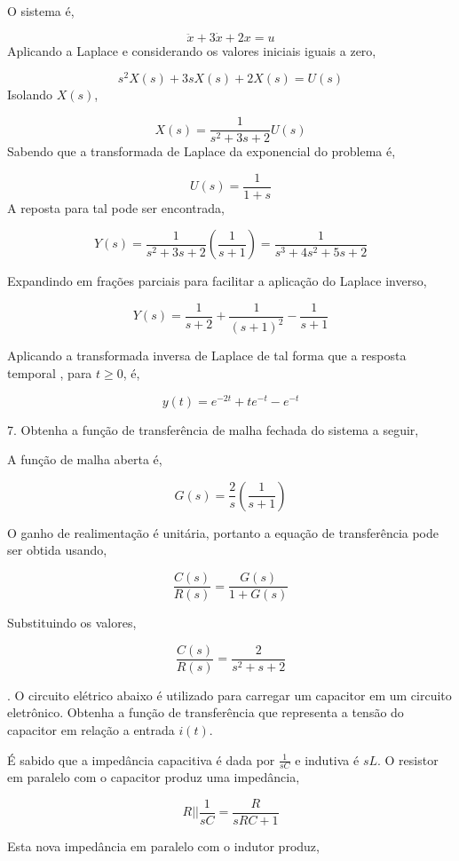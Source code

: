 \documentclass[paper=a4, fontsize=11pt]{article}
\begin{document}
O sistema é,

$$
\ddot{x} + 3 \dot{x} + 2 x = u
$$
Aplicando a Laplace e considerando os valores iniciais iguais a zero,

$$
s^2 X(s) + 3 s X(s) + 2 X(s) = U(s)
$$
Isolando $X(s)$,

$$
X(s) = \frac{1}{s^2 + 3s + 2} U(s)
$$
Sabendo que a transformada de Laplace da exponencial do problema é,

$$
U(s)=\frac{1}{1+s}
$$
A reposta para tal pode ser encontrada,

$$
Y(s) = \frac{1}{s^2 + 3s + 2} \left(\frac{1}{s+1}\right) = \frac{1}{s^3 + 4 s^2 + 5 s +2}
$$

Expandindo em frações parciais para facilitar a aplicação do Laplace inverso,

$$
Y(s) = \frac{1}{s+2} + \frac{1}{(s+1)^2} - \frac{1}{s+1}
$$

Aplicando a transformada inversa de Laplace de tal forma que a resposta temporal , para $t\geq0$, é,

$$
y(t) = e^{-2t} + t e^{-t} - e^{-t}
$$

\newpage

7. Obtenha a função de transferência de malha fechada do sistema a seguir,

A função de malha aberta é,

$$
G(s) = \frac{2}{s} \left(\frac{1}{s+1}\right)
$$

O ganho de realimentação é unitária, portanto a equação de transferência pode ser 
obtida usando,

$$
\frac{C(s)}{R(s)} = \frac{G(s)}{1 + G(s)}
$$

Substituindo os valores,

$$
\frac{C(s)}{R(s)} = \frac{2}{s^2+s+2}
$$


. O circuito elétrico abaixo é utilizado para carregar um capacitor em um circuito eletrônico.
Obtenha a função de transferência que representa a tensão do capacitor em relação a entrada
$i(t)$.

É sabido que a impedância capacitiva é dada por $\frac{1}{s C}$ e indutiva é $s L $. O resistor
em paralelo com o capacitor produz uma impedância,

$$
R || \frac{1}{s C} = \frac{R}{s R C + 1}
$$

Esta nova impedância em paralelo com o indutor produz,
\end{document}
